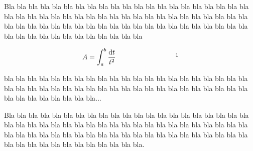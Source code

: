 \documentclass{article}
\renewenvironment{leftbar}{%
		\def\FrameCommand{\vrule width 0.4pt \hspace{10pt}}%
		\MakeFramed{\advance\hsize-\width \FrameRestore} %
	}%
	{\endMakeFramed}
\begin{document}
\vspace*{14cm}


\begin{leftbar}
	Bla bla bla bla bla bla bla bla bla bla bla bla bla bla bla bla bla bla bla bla bla bla bla bla bla
	bla bla bla bla bla bla bla bla bla bla bla bla bla bla bla bla bla bla bla bla bla bla bla bla bla
	bla bla bla bla bla bla bla bla bla bla bla bla bla bla bla bla bla bla bla bla bla bla bla bla bla

	\[A = \int_a^b \frac{\mathrm{d} t}{t^2} \hspace{3cm} \footnotemark\] 

	bla bla bla bla bla bla bla bla bla bla bla bla bla bla bla bla bla bla bla bla bla bla bla bla bla
	bla bla bla bla bla bla bla bla bla bla bla bla bla bla bla bla bla bla bla bla bla bla bla bla bla...

	Bla bla bla bla bla bla bla bla bla bla bla bla bla bla bla bla bla bla bla bla bla bla bla bla bla
	bla bla bla bla bla bla bla bla bla bla bla bla bla bla bla bla bla bla bla bla bla bla bla bla bla
	bla bla bla bla bla bla bla bla bla bla bla bla bla bla bla bla bla bla bla bla bla bla bla bla bla. \footnotemark
\end{leftbar}

\end{document}
